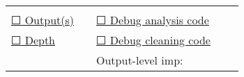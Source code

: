 \documentclass[]{book}
\begin{document}
\begin{longtable}[]{@{}lllll@{}}
\begin{minipage}[t]{0.06\columnwidth}
\strut
\end{minipage}\tabularnewline
\begin{minipage}[t]{0.28\columnwidth}\raggedright
\protect\hyperlink{outputs}{☐ Output(s)}\strut
\end{minipage} & \begin{minipage}[t]{0.27\columnwidth}\raggedright
\strut
\end{minipage} & \begin{minipage}[t]{0.19\columnwidth}\raggedright
\protect\hyperlink{dac}{☐ Debug analysis code}\strut
\end{minipage} & \begin{minipage}[t]{0.07\columnwidth}\raggedright
\strut
\end{minipage} & \begin{minipage}[t]{0.06\columnwidth}\raggedright
\strut
\end{minipage}\tabularnewline
\begin{minipage}[t]{0.28\columnwidth}\raggedright
\protect\hyperlink{intensive}{☐ Depth}\strut
\end{minipage} & \begin{minipage}[t]{0.27\columnwidth}\raggedright
\strut
\end{minipage} & \begin{minipage}[t]{0.19\columnwidth}\raggedright
\protect\hyperlink{dcc}{☐ Debug cleaning code}\strut
\end{minipage} & \begin{minipage}[t]{0.07\columnwidth}\raggedright
\strut
\end{minipage} & \begin{minipage}[t]{0.06\columnwidth}\raggedright
\strut
\end{minipage}\tabularnewline
\begin{minipage}[t]{0.28\columnwidth}\raggedright
\strut
\end{minipage} & \begin{minipage}[t]{0.27\columnwidth}\raggedright
\strut
\end{minipage} & \begin{minipage}[t]{0.19\columnwidth}\raggedright
Output-level imp:\strut
\end{minipage} & \begin{minipage}[t]{0.07\columnwidth}\raggedright
\strut
\end{minipage} & \begin{minipage}[t]{0.06\columnwidth}\raggedright
\strut
\end{minipage}\tabularnewline

\end{longtable}
\end{document}
